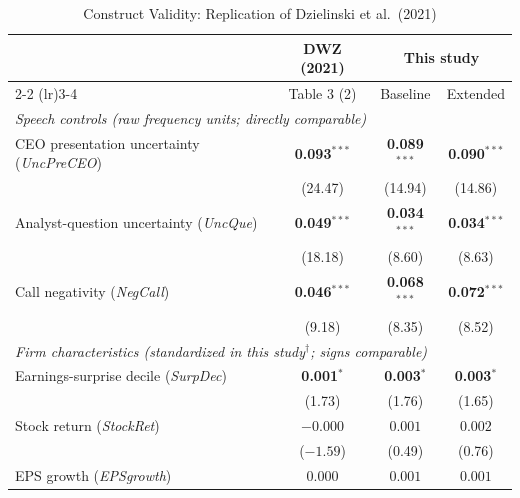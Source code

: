 \begin{table}[htbp]
\centering
\caption{Construct Validity: Replication of Dzielinski et al.\ (2021)}
\label{tab:dwz_replication}
\small
\begin{tabular}{lccc}
\toprule
 & DWZ (2021) & \multicolumn{2}{c}{This study} \\
\cmidrule(lr){2-2} \cmidrule(lr){3-4}
 & Table 3 (2) & Baseline & Extended \\
\midrule
\multicolumn{4}{l}{\textit{Speech controls (raw frequency units; directly comparable)}} \\
\midrule
CEO presentation uncertainty (\textit{UncPreCEO}) & \textbf{0.093}$^{***}$ & \textbf{0.089}$^{***}$ & \textbf{0.090}$^{***}$ \\
 & (24.47) & (14.94) & (14.86) \\
Analyst-question uncertainty (\textit{UncQue}) & \textbf{0.049}$^{***}$ & \textbf{0.034}$^{***}$ & \textbf{0.034}$^{***}$ \\
 & (18.18) & (8.60) & (8.63) \\
Call negativity (\textit{NegCall}) & \textbf{0.046}$^{***}$ & \textbf{0.068}$^{***}$ & \textbf{0.072}$^{***}$ \\
 & (9.18) & (8.35) & (8.52) \\
\midrule
\multicolumn{4}{l}{\textit{Firm characteristics (standardized in this study$^{\dagger}$; signs comparable)}} \\
\midrule
Earnings-surprise decile (\textit{SurpDec}) & \textbf{0.001}$^{*}$ & \textbf{0.003}$^{*}$ & \textbf{0.003}$^{*}$ \\
 & (1.73) & (1.76) & (1.65) \\
Stock return (\textit{StockRet}) & $-0.000$ & $0.001$ & $0.002$ \\
 & ($-1.59$) & (0.49) & (0.76) \\
EPS growth (\textit{EPSgrowth}) & $0.000$ & $0.001$ & $0.001$ \\

\end{tabular}
\end{table}
